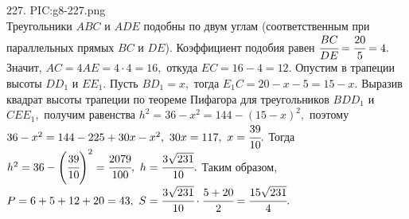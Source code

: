 227. {{PIC:g8-227.png}}\\
Треугольники $ABC$ и $ADE$ подобны по двум углам (соответственным при параллельных прямых $BC$ и $DE$). Коэффициент подобия равен $\cfrac{BC}{DE}=\cfrac{20}{5}=4.$ Значит, $AC=4AE=4\cdot4=16,$ откуда $EC=16-4=12.$ Опустим в трапеции высоты $DD_1$ и $EE_1.$ Пусть $BD_1=x,$ тогда $E_1C=20-x-5=15-x.$ Выразив квадрат высоты трапеции по теореме Пифагора для треугольников $BDD_1$ и $CEE_1,$ получим равенства $h^2=36-x^2=144-(15-x)^2,$ поэтому $36-x^2=144-225+30x-x^2,\ 30x=117,\ x=\cfrac{39}{10}.$ Тогда $h^2=36-\left(\cfrac{39}{10}\right)^2=\cfrac{2079}{100},\ h=\cfrac{3\sqrt{231}}{10}.$ Таким образом, $P=6+5+12+20=43,\ S=\cfrac{3\sqrt{231}}{10}\cdot\cfrac{5+20}{2}=\cfrac{15\sqrt{231}}{4}.$\\
